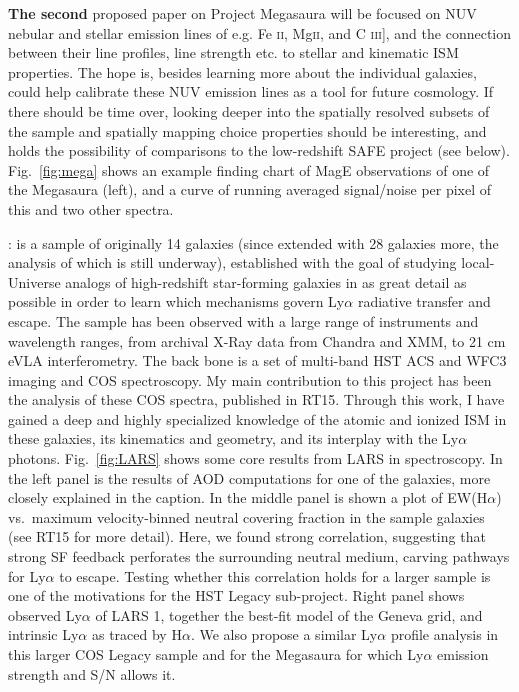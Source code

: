\documentclass[10pt, letterpaper, headings=Large, DIV=14]{scrartcl}
\begin{document}
\textbf{The second} proposed paper on
Project Megasaura will be focused on NUV nebular and stellar emission lines of
e.g. Fe \textsc{ii}, Mg\textsc{ii}, and C \textsc{iii}], and the connection
between their line profiles, line strength etc. to stellar and kinematic ISM
properties. The hope is, besides learning more about the individual galaxies,
could help calibrate these NUV emission lines as a tool for future cosmology. 
If there should be time over, looking deeper into the spatially
resolved subsets of the sample and spatially mapping choice properties should be
interesting, and holds the possibility of comparisons to the low-redshift SAFE
project (see below). 
Fig.~\ref{fig:mega} shows an example finding chart of MagE observations of one
of the Megasaura (left), and a curve of running averaged signal/noise per pixel
of this and two other spectra.  \newline



: is a
sample of originally 14 galaxies (since extended with 28 galaxies
more, the analysis of which is still underway), established with the goal of
studying local-Universe analogs of high-redshift star-forming galaxies in as
great detail as possible in order to learn which mechanisms govern Ly$\alpha$
radiative transfer and escape. The sample has been observed with a large range of
instruments and wavelength ranges, from archival X-Ray data from Chandra and
XMM, to 21 cm eVLA interferometry. The back bone is a set of multi-band HST ACS 
and WFC3 imaging and COS spectroscopy. My main contribution to this project has
been the analysis of these COS spectra, published in RT15. Through this work, I
have gained a deep and highly specialized knowledge of the atomic and ionized
ISM in these galaxies, its kinematics and geometry, and its interplay with the
Ly$\alpha$ photons. 
Fig.~\ref{fig:LARS} shows some core results from LARS in spectroscopy. In the
left panel is the results of AOD computations for one of the galaxies, more
closely explained in the caption. In the middle panel is shown a plot of
EW(H$\alpha$) vs.\ maximum velocity-binned neutral covering fraction in the sample
galaxies (see RT15 for more detail). Here, we found strong correlation,
suggesting that strong SF feedback perforates the surrounding neutral medium,
carving pathways for Ly$\alpha$ to escape. Testing whether this correlation
holds for a larger sample is one of the motivations for the HST Legacy
sub-project. Right panel shows observed Ly$\alpha$ of LARS 1, together the
best-fit model of the Geneva grid, and intrinsic Ly$\alpha$ as traced by
H$\alpha$.  We also propose a similar Ly$\alpha$ profile analysis in this larger
COS Legacy sample and for the Megasaura for which Ly$\alpha$ emission strength
and S/N allows it. 
\end{document}
